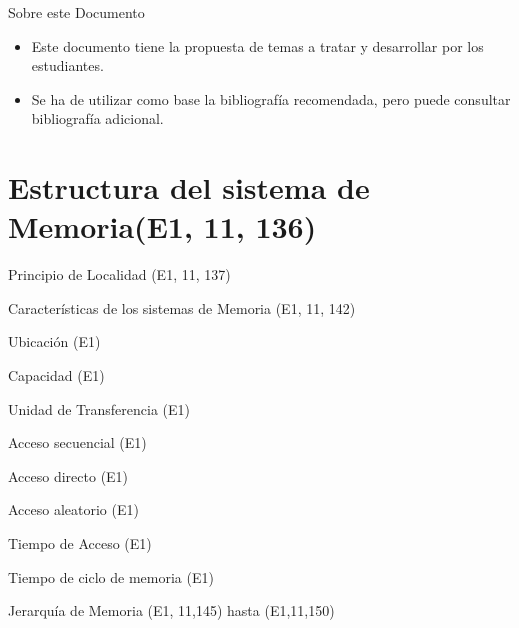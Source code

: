 \documentclass[presentation]{beamer}
\begin{document}
\begin{frame}[label={sec:orgb70bab0}]{Sobre este Documento}
\begin{itemize}
\item Este documento tiene la propuesta de temas a tratar y desarrollar
por los estudiantes.
\item Se ha de utilizar como base la bibliografía recomendada, pero puede
consultar bibliografía adicional.
\end{itemize}
\end{frame}
\section{Estructura del sistema de Memoria(E1, 11, 136)}
\label{sec:orgbbcc6a9}
\begin{frame}[label={sec:orgb28f405}]{Principio de Localidad (E1, 11, 137)}
\end{frame}
\begin{frame}[label={sec:org2d77c82}]{Características de los sistemas de Memoria (E1, 11, 142)}
\end{frame}
\begin{frame}[label={sec:orgc9669ff}]{Ubicación (E1)}
\end{frame}
\begin{frame}[label={sec:org952d763}]{Capacidad (E1)}
\end{frame}
\begin{frame}[label={sec:orgf48360d}]{Unidad de Transferencia (E1)}
\end{frame}
\begin{frame}[label={sec:orgf1a6e8d}]{Acceso secuencial (E1)}
\end{frame}
\begin{frame}[label={sec:orgad7f9b0}]{Acceso directo (E1)}
\end{frame}
\begin{frame}[label={sec:orge80f3cf}]{Acceso aleatorio (E1)}
\end{frame}
\begin{frame}[label={sec:orgd581a35}]{Tiempo de Acceso (E1)}
\end{frame}
\begin{frame}[label={sec:orgd69d8e0}]{Tiempo de ciclo de memoria (E1)}
\end{frame}
\begin{frame}[label={sec:org6b31941}]{Jerarquía de Memoria (E1, 11,145) hasta (E1,11,150)}
\end{frame}
\end{document}
